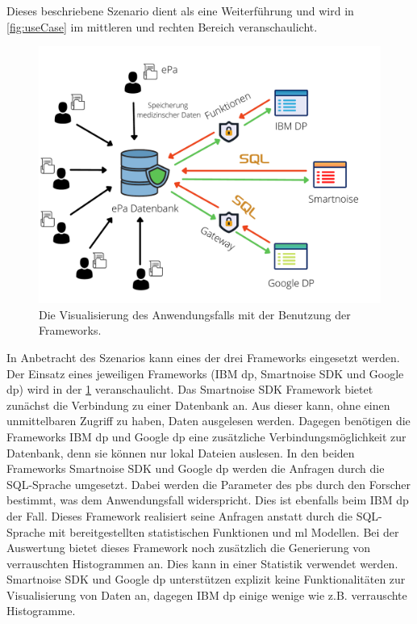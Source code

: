 Dieses beschriebene Szenario dient als eine Weiterführung und wird in \cref{fig:useCase} im mittleren und rechten Bereich veranschaulicht.

\begin{figure}[htbp]
	\centering
	\includegraphics[scale=0.3]{./images/use_case2.pdf}
	\caption{Die Visualisierung des Anwendungsfalls mit der Benutzung der Frameworks.}
	\label{fig:use_case2}
\end{figure}

In Anbetracht des Szenarios kann eines der drei Frameworks eingesetzt werden. Der Einsatz eines jeweiligen Frameworks (IBM \gls{dp}, Smartnoise SDK und Google \gls{dp}) wird in der \cref{fig:use_case2} veranschaulicht. 
Das Smartnoise SDK Framework bietet zunächst die Verbindung zu einer Datenbank an. Aus dieser kann, ohne einen unmittelbaren Zugriff zu haben, Daten ausgelesen werden. Dagegen benötigen die Frameworks IBM \gls{dp} und Google \gls{dp} eine zusätzliche Verbindungsmöglichkeit zur Datenbank, denn sie können nur lokal Dateien auslesen. In den beiden Frameworks Smartnoise SDK und Google \gls{dp} werden die Anfragen durch die SQL-Sprache umgesetzt. Dabei werden die Parameter des \gls{pb}s durch den Forscher bestimmt, was dem Anwendungsfall widerspricht. Dies ist ebenfalls beim IBM \gls{dp} der Fall. Dieses Framework realisiert seine Anfragen anstatt durch die SQL-Sprache mit bereitgestellten statistischen Funktionen und \gls{ml} Modellen. Bei der Auswertung bietet dieses Framework noch zusätzlich die Generierung von verrauschten Histogrammen an. Dies kann in einer Statistik verwendet werden. Smartnoise SDK und Google \gls{dp} unterstützen explizit keine Funktionalitäten zur Visualisierung von Daten an, dagegen IBM \gls{dp} einige wenige wie z.B. verrauschte Histogramme.

